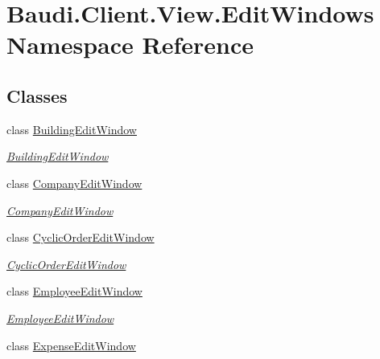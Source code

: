 \hypertarget{namespace_baudi_1_1_client_1_1_view_1_1_edit_windows}{}\section{Baudi.\+Client.\+View.\+Edit\+Windows Namespace Reference}
\label{namespace_baudi_1_1_client_1_1_view_1_1_edit_windows}
\subsection*{Classes}
\begin{DoxyCompactItemize}
\item 
class \hyperlink{class_baudi_1_1_client_1_1_view_1_1_edit_windows_1_1_building_edit_window}{Building\+Edit\+Window}
\begin{DoxyCompactList}\small\item\em \hyperlink{class_baudi_1_1_client_1_1_view_1_1_edit_windows_1_1_building_edit_window}{Building\+Edit\+Window} \end{DoxyCompactList}\item 
class \hyperlink{class_baudi_1_1_client_1_1_view_1_1_edit_windows_1_1_company_edit_window}{Company\+Edit\+Window}
\begin{DoxyCompactList}\small\item\em \hyperlink{class_baudi_1_1_client_1_1_view_1_1_edit_windows_1_1_company_edit_window}{Company\+Edit\+Window} \end{DoxyCompactList}\item 
class \hyperlink{class_baudi_1_1_client_1_1_view_1_1_edit_windows_1_1_cyclic_order_edit_window}{Cyclic\+Order\+Edit\+Window}
\begin{DoxyCompactList}\small\item\em \hyperlink{class_baudi_1_1_client_1_1_view_1_1_edit_windows_1_1_cyclic_order_edit_window}{Cyclic\+Order\+Edit\+Window} \end{DoxyCompactList}\item 
class \hyperlink{class_baudi_1_1_client_1_1_view_1_1_edit_windows_1_1_employee_edit_window}{Employee\+Edit\+Window}
\begin{DoxyCompactList}\small\item\em \hyperlink{class_baudi_1_1_client_1_1_view_1_1_edit_windows_1_1_employee_edit_window}{Employee\+Edit\+Window} \end{DoxyCompactList}\item 
class \hyperlink{class_baudi_1_1_client_1_1_view_1_1_edit_windows_1_1_expense_edit_window}{Expense\+Edit\+Window}

\end{DoxyCompactItemize}
